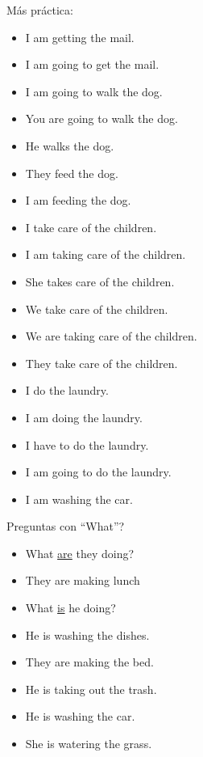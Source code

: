 Más práctica:
\begin{itemize}
	\item {} \arr I am getting the mail.
	\item {} \arr I am going to get the mail.
	\item {} \arr I am going to walk the dog.
	\item {} \arr You are going to walk the dog.
	\item {} \arr He walks the dog.
	\item {} \arr They feed the dog.
	\item {} \arr I am feeding the dog.
	\item {} \arr I take care of the children.
	\item {} \arr I am taking care of the children.
	\item {} \arr She takes care of the children.
	\item {} \arr We take care of the children.
	\item {} \arr We are taking care of the children.
	\item {} \arr They take care of the children.
	\item {} \arr I do the laundry.
	\item {} \arr I am doing the laundry.
	\item {} \arr I have to do the laundry.
	\item {} \arr I am going to do the laundry.
	\item {} \arr I am washing the car.
\end{itemize}

Preguntas con ``What''?
\begin{itemize}
	\item What \underline{are} they doing? \arr {}
	\item They are making lunch \arr {}
	\item What \underline{is} he doing? \arr {}
	\item He is washing the dishes. \arr {}
	\item They are making the bed. \arr {}
	\item He is taking out the trash. \arr {}
	\item He is washing the car. \arr {}
	\item She is watering the grass. \arr {}
\end{itemize}

